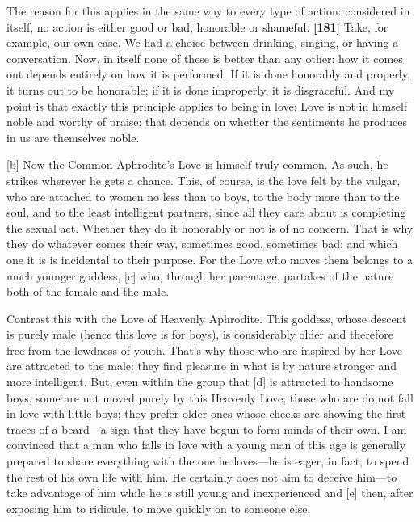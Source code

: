 The reason for this applies in the same way to every type of action:
considered in itself, no action is either good or bad, honorable or
shameful. {\bf {[}181{]}} Take, for example, our own case. We had a
choice between drinking, singing, or having a conversation. Now, in
itself none of these is better than any other: how it comes out depends
entirely on how it is performed. If it is done honorably and properly,
it turns out to be honorable; if it is done improperly, it is
disgraceful. And my point is that exactly this principle applies to
being in love: Love is not in himself noble and worthy of praise; that
depends on whether the sentiments he produces in us are themselves
noble.

{[}b{]} Now the Common Aphrodite's Love is himself truly common. As
such, he strikes wherever he gets a chance. This, of course, is the love
felt by the vulgar, who are attached to women no less than to boys, to
the body more than to the soul, and to the least intelligent partners,
since all they care about is completing the sexual act. Whether they do
it honorably or not is of no concern. That is why they do whatever comes
their way, sometimes good, sometimes bad; and which one it is is
incidental to their purpose. For the Love who moves them belongs to a
much younger goddess, {[}c{]} who, through her parentage, partakes of
the nature both of the female and the male.

Contrast this with the Love of Heavenly Aphrodite. This goddess, whose
descent is purely male (hence this love is for boys), is considerably
older and therefore free from the lewdness of youth. That's why those
who are inspired by her Love are attracted to the male: they find
pleasure in what is by nature stronger and more intelligent. But, even
within the group that {[}d{]} is attracted to handsome boys, some are
not moved purely by this Heavenly Love; those who are do not fall in
love with little boys; they prefer older ones whose cheeks are showing
the first traces of a beard---a sign that they have begun to form minds
of their own. I am convinced that a man who falls in love with a young
man of this age is generally prepared to share everything with the one
he loves---he is eager, in fact, to spend the rest of his own life with
him. He certainly does not aim to deceive him---to take advantage of him
while he is still young and inexperienced and {[}e{]} then, after
exposing him to ridicule, to move quickly on to someone else.

